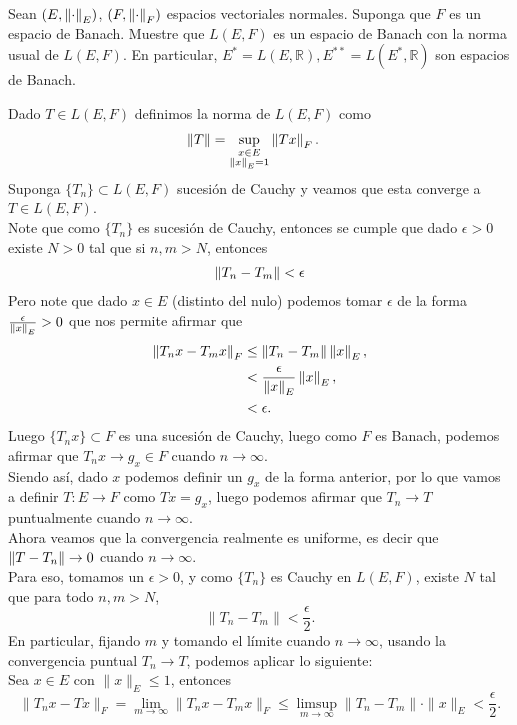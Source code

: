 \begin{homeworkProblem}
  Sean $(E,\left\|\cdot\right\|_{E})$, $(F,\left\|\cdot\right\|_{F})$ espacios vectoriales normales. Suponga que $F$ es un espacio de Banach. Muestre que $L(E,F)$ es un espacio de Banach con la norma usual de $L(E,F)$. En particular, $E^{*}=L(E,\mathbb{R}),E^{**}=L(E^{*},\mathbb{R})$ son espacios de Banach. 
  \begin{solution}
    Dado $T\in L(E,F)$ definimos la norma de $L(E,F)$ como
    \begin{align*}
      \left\|T\right\|&=\sup_{\substack{x\in E\\\left\|x\right\|_{E}=1}}\left\|Tx\right\|_{F}.
    \end{align*}
    Suponga $\{T_n\}\subset L(E,F)$ sucesión de Cauchy y veamos que esta converge a $T\in L(E,F)$.\\
    Note que como $\{T_n\}$ es sucesión de Cauchy, entonces se cumple que dado $\epsilon>0$ existe $N>0$ tal que si $n,m>N$, entonces
    \begin{align*}
      \left\|T_n-T_m\right\|<\epsilon
    \end{align*}
    Pero note que dado $x\in E$ (distinto del nulo) podemos tomar $\epsilon$ de la forma $\frac{\epsilon}{\left\|x\right\|_{E}}>0$ que nos permite afirmar que 
    \begin{align*}
      \left\|T_nx-T_mx\right\|_{F}&\leq \left\|T_n-T_m\right\|\left\|x\right\|_{E},\\
      &<\frac{\epsilon}{\left\|x\right\|_{E}}\left\|x\right\|_{E},\\
      &<\epsilon.
    \end{align*}
    Luego $\{T_nx\}\subset F$ es una sucesión de Cauchy, luego como $F$ es Banach, podemos afirmar que $T_{n}x\to g_x\in F$ cuando $n\to \infty$.\\
    Siendo así, dado $x$ podemos definir un $g_x$ de la forma anterior, por lo que vamos a definir $T:E\to F$ como $Tx=g_x$, luego podemos afirmar que $T_n\to T$ puntualmente cuando $n\to \infty$.\\
    Ahora veamos que la convergencia realmente es uniforme, es decir que $\left\|T-T_n\right\|\to 0$ cuando $n\to \infty$.\\
    Para eso, tomamos un $\epsilon > 0$, y como $\{T_n\}$ es Cauchy en $L(E,F)$, existe $N$ tal que para todo $n, m > N$,
    $$\|T_n - T_m\| < \frac{\epsilon}{2}.$$
    En particular, fijando $m$ y tomando el límite cuando $n \to \infty$, usando la convergencia puntual $T_n \to T$, podemos aplicar lo siguiente:\\
    Sea $x \in E$ con $\|x\|_E \leq 1$, entonces
    $$\|T_n x - T x\|_F = \lim_{m \to \infty} \|T_n x - T_m x\|_F \leq \limsup_{m \to \infty} \|T_n - T_m\| \cdot \|x\|_E < \frac{\epsilon}{2}.$$

\end{solution}
\end{homeworkProblem}
